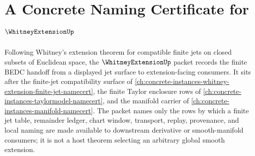 \chapter{A Concrete Naming Certificate for $\WhitneyExtensionUp$}
\label{ch:concrete-instances-whitney-extension-namecert}

Following Whitney's extension theorem for compatible finite jets on closed subsets of Euclidean space, the $\WhitneyExtensionUp$ packet records the finite BEDC handoff from a displayed jet surface to extension-facing consumers. It sits after the finite-jet compatibility surface of \autoref{ch:concrete-instances-whitney-extension-finite-jet-namecert}, the finite Taylor enclosure rows of \autoref{ch:concrete-instances-taylormodel-namecert}, and the manifold carrier of \autoref{ch:concrete-instances-manifold-namecert}. The packet names only the rows by which a finite jet table, remainder ledger, chart window, transport, replay, provenance, and local naming are made available to downstream derivative or smooth-manifold consumers; it is not a host theorem selecting an arbitrary global smooth extension.

